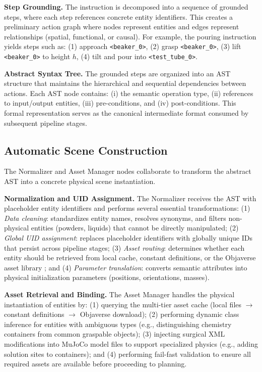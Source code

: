 \documentclass[letterpaper]{article} %
\begin{document}
\textbf{Step Grounding.} The instruction is decomposed into a sequence of grounded steps, where each step references concrete entity identifiers. This creates a preliminary action graph where nodes represent entities and edges represent relationships (spatial, functional, or causal). For example, the pouring instruction yields steps such as: (1) approach \texttt{<beaker\_0>}, (2) grasp \texttt{<beaker\_0>}, (3) lift \texttt{<beaker\_0>} to height $h$, (4) tilt and pour into \texttt{<test\_tube\_0>}.

\textbf{Abstract Syntax Tree.} The grounded steps are organized into an AST structure that maintains the hierarchical and sequential dependencies between actions. Each AST node contains: (i) the semantic operation type, (ii) references to input/output entities, (iii) pre-conditions, and (iv) post-conditions. This formal representation serves as the canonical intermediate format consumed by subsequent pipeline stages.

\subsection{Automatic Scene Construction}

The Normalizer and Asset Manager nodes collaborate to transform the abstract AST into a concrete physical scene instantiation.

\textbf{Normalization and UID Assignment.} The Normalizer receives the AST with placeholder entity identifiers and performs several essential transformations: (1) \textit{Data cleaning}: standardizes entity names, resolves synonyms, and filters non-physical entities (powders, liquids) that cannot be directly manipulated; (2) \textit{Global UID assignment}: replaces placeholder identifiers with globally unique IDs that persist across pipeline stages; (3) \textit{Asset routing}: determines whether each entity should be retrieved from local cache, constant definitions, or the Objaverse asset library \cite{deitke2023objaverse}; and (4) \textit{Parameter translation}: converts semantic attributes into physical initialization parameters (positions, orientations, masses).

\textbf{Asset Retrieval and Binding.} The Asset Manager handles the physical instantiation of entities by: (1) querying the multi-tier asset cache (local files $\rightarrow$ constant definitions $\rightarrow$ Objaverse download); (2) performing dynamic class inference for entities with ambiguous types (e.g., distinguishing chemistry containers from common graspable objects); (3) injecting surgical XML modifications into MuJoCo model files to support specialized physics (e.g., adding solution sites to containers); and (4) performing fail-fast validation to ensure all required assets are available before proceeding to planning.
\end{document}
